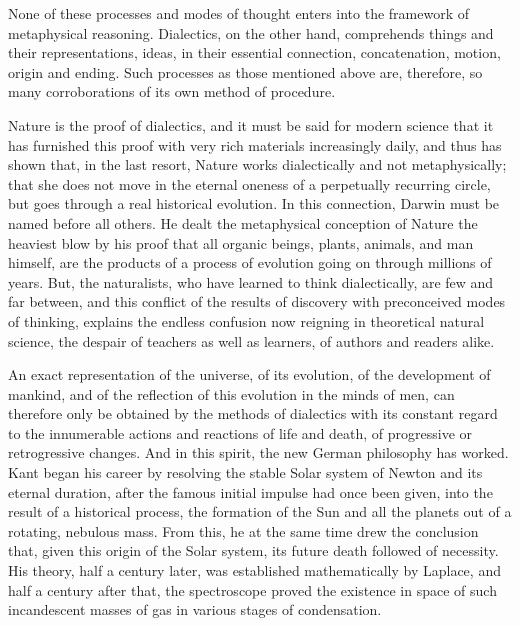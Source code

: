 None of these processes and modes of thought enters into the framework of
metaphysical reasoning. Dialectics, on the other hand, comprehends things and
their representations, ideas, in their essential connection, concatenation,
motion, origin and ending. Such processes as those mentioned above are,
therefore, so many corroborations of its own method of procedure.

Nature is the proof of dialectics, and it must be said for modern science that
it has furnished this proof with very rich materials increasingly daily, and
thus has shown that, in the last resort, Nature works dialectically and not
metaphysically; that she does not move in the eternal oneness of a perpetually
recurring circle, but goes through a real historical evolution. In this
connection, Darwin must be named before all others. He dealt the metaphysical
conception of Nature the heaviest blow by his proof that all organic beings,
plants, animals, and man himself, are the products of a process of evolution
going on through millions of years. But, the naturalists, who have learned to
think dialectically, are few and far between, and this conflict of the results
of discovery with preconceived modes of thinking, explains the endless confusion
now reigning in theoretical natural science, the despair of teachers as well as
learners, of authors and readers alike.

An exact representation of the universe, of its evolution, of the development of
mankind, and of the reflection of this evolution in the minds of men, can
therefore only be obtained by the methods of dialectics with its constant regard
to the innumerable actions and reactions of life and death, of progressive or
retrogressive changes. And in this spirit, the new German philosophy has worked.
Kant began his career by resolving the stable Solar system of Newton and its
eternal duration, after the famous initial impulse had once been given, into the
result of a historical process, the formation of the Sun and all the planets out
of a rotating, nebulous mass. From this, he at the same time drew the conclusion
that, given this origin of the Solar system, its future death followed of
necessity. His theory, half a century later, was established mathematically by
Laplace, and half a century after that, the spectroscope proved the existence in
space of such incandescent masses of gas in various stages of condensation.

\printendnotes

